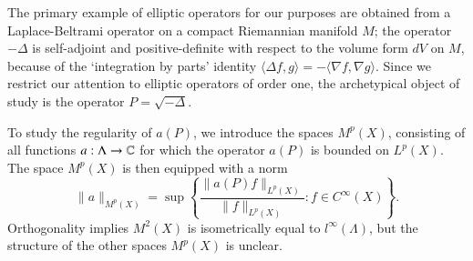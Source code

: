 %
%

The primary example of elliptic operators for our purposes are obtained from a Laplace-Beltrami operator on a compact Riemannian manifold $M$; the operator $-\Delta$ is self-adjoint and positive-definite with respect to the volume form $dV$ on $M$, because of the `integration by parts' identity $\langle \Delta f, g \rangle = - \langle \nabla f, \nabla g \rangle$. Since we restrict our attention to elliptic operators of order one, the archetypical object of study is the operator $P = \sqrt{-\Delta}$.

To study the regularity of $a(P)$, we introduce the spaces $M^p(X)$, consisting of all functions $a: \Lambda \to \operatorname{\mathbb{C}}$ for which the operator $a(P)$ is  bounded on $L^p(X)$. The space $M^p(X)$ is then equipped with a norm
%
\[ \| a \|_{M^p(X)} = \sup \left\{ \frac{\| a(P) f \|_{L^p(X)}}{\| f \|_{L^p(X)}} : f \in C^\infty(X) \right\}. \]
%
Orthogonality implies $M^2(X)$ is isometrically equal to $l^\infty(\Lambda)$, but the structure of the other spaces $M^p(X)$ is unclear.

